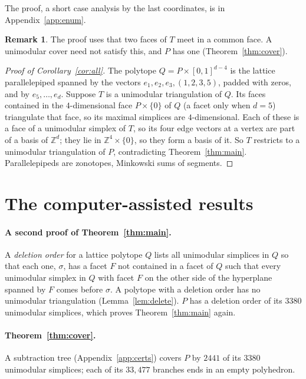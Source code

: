 \documentclass[11pt]{article}
\theoremstyle{definition}
\newtheorem{remark}[theorem]{Remark}
\newcommand{\Z}{\mathbb{Z}}
\begin{document}
The proof, a short case analysis by the last coordinates, is in
Appendix~\ref{app:enum}.

\begin{remark}
The proof uses that two faces of $T$ meet in a common face. A unimodular
cover need not satisfy this, and $P$ has one (Theorem~\ref{thm:cover}).
\end{remark}

\begin{proof}[Proof of Corollary~\ref{cor:all}]
The polytope $Q=P\times[0,1]^{d-4}$ is the lattice parallelepiped spanned
by the vectors $e_1,e_2,e_3,(1,2,3,5)$, padded with zeros, and by
$e_5,\dots,e_d$. Suppose $T$ is a unimodular
triangulation of $Q$. Its faces contained in the $4$-dimensional face
$P\times\{0\}$ of $Q$ (a facet only when $d=5$) triangulate that face, so
its maximal simplices are $4$-dimensional. Each of these is a face of a
unimodular simplex of $T$, so its four edge vectors at a vertex are part of
a basis of $\Z^d$; they lie in $\Z^4\times\{0\}$, so they form a basis of
it. So $T$ restricts to a unimodular triangulation of $P$, contradicting
Theorem~\ref{thm:main}. Parallelepipeds are zonotopes, Minkowski sums of
segments.
\end{proof}

\section{The computer-assisted results}\label{sec:computed}

\paragraph{A second proof of Theorem~\ref{thm:main}.}
A \emph{deletion order} for a lattice polytope $Q$ lists all unimodular
simplices in $Q$ so that each one, $\sigma$, has a facet $F$ not contained
in a facet of $Q$ such that every unimodular simplex in $Q$ with facet $F$
on the other side of the hyperplane spanned by $F$ comes before $\sigma$. A
polytope with a deletion order has no unimodular triangulation
(Lemma~\ref{lem:delete}). $P$ has a deletion order of its $3380$ unimodular
simplices, which proves Theorem~\ref{thm:main} again.

\paragraph{Theorem~\ref{thm:cover}.}
A subtraction tree (Appendix~\ref{app:certs}) covers $P$ by $2441$ of its
$3380$ unimodular simplices; each of its $33{,}477$ branches ends in an
empty polyhedron.
\end{document}
